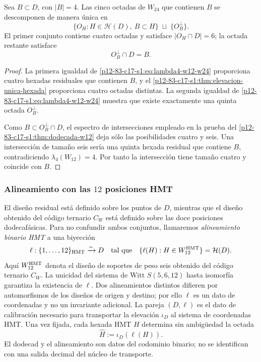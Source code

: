 \begin{corollary}
\label{p12-83-c17-s1:cor:cuatro-mas-uno-w24}
Sea \(B\subset D\), con \(|B|=4\). Las cinco octadas de \(W_{24}\) que
contienen \(B\) se descomponen de manera única en
\[
 \{O_H:H\in\mathcal H(D),\ B\subset H\}
 \;\sqcup\;\{O_B^\perp\}.
\]
El primer conjunto contiene cuatro octadas y satisface
\(|O_H\cap D|=6\); la octada restante satisface
\[
 O_B^\perp\cap D=B.
\]
\end{corollary}

\begin{proof}
La primera igualdad de \eqref{p12-83-c17-s1:eq:lambda4-w12-w24} proporciona cuatro hexadas
residuales que contienen \(B\), y el
\cref{p12-83-c17-s1:thm:elevacion-unica-hexada} proporciona cuatro octadas distintas. La
segunda igualdad de \eqref{p12-83-c17-s1:eq:lambda4-w12-w24} muestra que existe exactamente
una quinta octada \(O_B^\perp\).

Como \(B\subset O_B^\perp\cap D\), el espectro de intersecciones empleado en
la prueba del \cref{p12-83-c17-s1:thm:dodecada-w12} deja sólo las posibilidades cuatro y
seis. Una intersección de tamaño seis sería una quinta hexada residual que
contiene \(B\), contradiciendo \(\lambda_4(W_{12})=4\). Por tanto la
intersección tiene tamaño cuatro y coincide con \(B\).
\end{proof}

\subsubsection{Alineamiento con las \(12\) posiciones HMT}

El diseño residual está definido sobre los puntos de \(D\), mientras que el
diseño obtenido del código ternario \(C_W\) está definido sobre las doce
posiciones dodecafásicas. Para no confundir ambos conjuntos, llamaremos
\emph{alineamiento binario HMT} a una biyección
\begin{equation}
 \ell:\{1,\ldots,12\}_{\rm HMT}\xrightarrow{\sim}D
 \quad\text{tal que}\quad
 \{\ell(H):H\in W_{12}^{\rm HMT}\}=\mathcal H(D).
 \label{p12-83-c17-s1:eq:alineamiento-hmt-w24}
\end{equation}
Aquí \(W_{12}^{\rm HMT}\) denota el diseño de soportes de peso seis
obtenido del código ternario \(C_W\). La unicidad del sistema de Witt
\(S(5,6,12)\) hasta isomorfía garantiza la existencia de \(\ell\). Dos
alineamientos distintos difieren por automorfismos de los diseños de origen y
destino; por ello \(\ell\) es un dato de coordenadas y no un invariante
adicional.
La pareja \((D,\ell)\) es el dato de calibración necesario para transportar
la elevación \(\iota_D\) al sistema de coordenadas HMT\@. Una vez fijada, cada
hexada HMT \(H\) determina sin ambigüedad la octada
\[
 \widehat H:=\iota_D(\ell(H)).
\]
El dodecad y el alineamiento son datos del codominio binario; no se identifican
con una salida decimal del núcleo de transporte.

